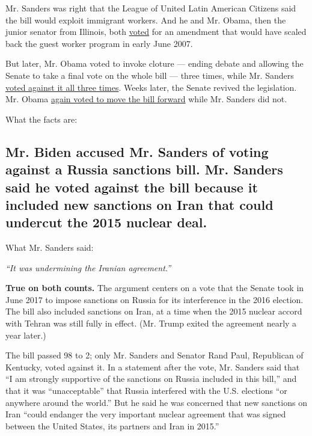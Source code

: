 Mr. Sanders was right that the League of United Latin American Citizens
said the bill would exploit immigrant workers. And he and Mr. Obama,
then the junior senator from Illinois, both
\href{https://www.senate.gov/legislative/LIS/roll_call_lists/roll_call_vote_cfm.cfm?congress=110\&session=1\&vote=00201}{voted}
for an amendment that would have scaled back the guest worker program in
early June 2007.

But later, Mr. Obama voted to invoke cloture --- ending debate and
allowing the Senate to take a final vote on the whole bill --- three
times, while Mr. Sanders
\href{https://www.congress.gov/bill/110th-congress/senate-bill/1348/all-actions?overview=closed\&q=\%7B\%22roll-call-vote\%22:\%22all\%22\%7D\&KWICView=false}{voted
against it all three times}. Weeks later, the Senate revived the
legislation. Mr. Obama
\href{https://www.congress.gov/bill/110th-congress/senate-bill/1639/all-actions?overview=closed\&q=\%7B\%22roll-call-vote\%22:\%22all\%22\%7D\&KWICView=false}{again
voted to move the bill forward} while Mr. Sanders did not.

What the facts are:

\hypertarget{mr-biden-accused-mr-sanders-of-voting-against-a-russia-sanctions-bill-mr-sanders-said-he-voted-against-the-bill-because-it-included-new-sanctions-on-iran-that-could-undercut-the-2015-nuclear-deal}{%
\subsection{Mr. Biden accused Mr. Sanders of voting against a Russia
sanctions bill. Mr. Sanders said he voted against the bill because it
included new sanctions on Iran that could undercut the 2015 nuclear
deal.}\label{mr-biden-accused-mr-sanders-of-voting-against-a-russia-sanctions-bill-mr-sanders-said-he-voted-against-the-bill-because-it-included-new-sanctions-on-iran-that-could-undercut-the-2015-nuclear-deal}}

What Mr. Sanders said:

\emph{``It was undermining the Iranian agreement.''}

\textbf{True on both counts.} The argument centers on a vote that the
Senate took in June 2017 to impose sanctions on Russia for its
interference in the 2016 election. The bill also included sanctions on
Iran, at a time when the 2015 nuclear accord with Tehran was still fully
in effect. (Mr. Trump exited the agreement nearly a year later.)

The bill passed 98 to 2; only Mr. Sanders and Senator Rand Paul,
Republican of Kentucky, voted against it. In a statement after the vote,
Mr. Sanders said that ``I am strongly supportive of the sanctions on
Russia included in this bill,'' and that it was ``unacceptable'' that
Russia interfered with the U.S. elections ``or anywhere around the
world.'' But he said he was concerned that new sanctions on Iran ``could
endanger the very important nuclear agreement that was signed between
the United States, its partners and Iran in 2015.''

